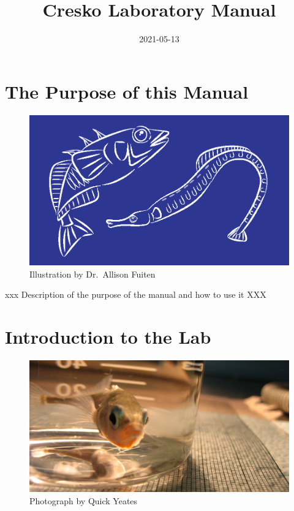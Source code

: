 \documentclass[
]{book}
\title{Cresko Laboratory Manual}
\author{}
\date{\vspace{-2.5em}2021-05-13}
\begin{document}
\maketitle

{
\setcounter{tocdepth}{1}
\tableofcontents
}
\hypertarget{the-purpose-of-this-manual}{%
\chapter{The Purpose of this Manual}\label{the-purpose-of-this-manual}}

\begin{figure}
\centering
\includegraphics{images/Lab_logo.png}
\caption{Illustration by Dr.~Allison Fuiten}
\end{figure}

xxx Description of the purpose of the manual and how to use it XXX

\hypertarget{introduction-to-the-lab}{%
\chapter{Introduction to the Lab}\label{introduction-to-the-lab}}

\begin{figure}
\centering
\includegraphics{images/beaker_logo.jpg}
\caption{Photograph by Quick Yeates}
\end{figure}
\end{document}
